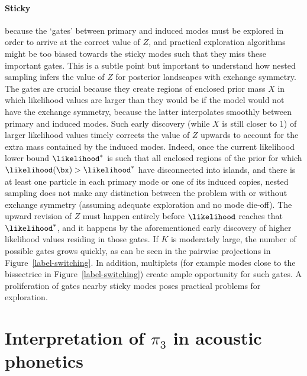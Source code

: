 \begin{chapterappendices}{6}
\paragraph{Sticky} because the `gates' \citep[Sec.~9.5]{Sivia2006} between primary and induced modes must be explored
in order to arrive at the correct value of $Z$, and practical exploration algorithms might be too biased towards the sticky modes such that they miss these important gates. This is a subtle point but important to understand how nested sampling infers the value of $Z$ for posterior landscapes with exchange symmetry. The gates are crucial because they create regions of enclosed prior mass $X$ in which likelihood values are larger than they would be if the model would not have the exchange symmetry, because the latter interpolates smoothly between primary and induced modes. Such early discovery (while $X$ is still closer to 1) of larger likelihood values timely corrects the value of $Z$ upwards to account for the extra mass contained by the induced modes. Indeed, once the current likelihood lower bound $\likelihood^*$ is such that all enclosed regions of the prior for which $\likelihood(\bx) > \likelihood^*$ have disconnected into islands, and there is at least one particle in each primary mode or one of its induced copies, nested sampling does not make any distinction between the problem with or without exchange symmetry (assuming adequate exploration and no mode die-off). The upward revision of $Z$ must happen entirely before $\likelihood$ reaches that $\likelihood^*$, and it happens by the aforementioned early discovery of higher likelihood values residing in those gates. If $K$ is moderately large, the number of possible gates grows quickly, as can be seen in the pairwise projections in Figure~\ref{label-switching}. In addition, multiplets (for example modes close to the bissectrice in Figure~\ref{label-switching}) create ample opportunity for such gates. A proliferation of gates nearby sticky modes poses practical problems for exploration.

\section{Interpretation of $\pi_3$ in acoustic phonetics\label{pi-theory}}



\end{chapterappendices}
